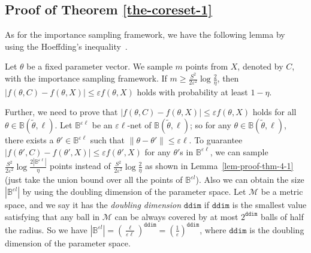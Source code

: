 \subsection{Proof of Theorem \ref{the-coreset-1}}\label{sec:proof-thm-4}
As for the importance sampling framework, we have the following lemma by using the Hoeffding's inequality~\cite{bachem2017practical}.
\begin{lemma}
\label{lem-proof-thm-4-1}
	Let $\theta$ be a fixed parameter vector. We sample $ m $ points from $ X $, denoted by $ C $, with the importance sampling framework. If $ m\geq \frac{S^2}{2\varepsilon^2}\log\frac{2}{\eta} $, then $ |{f}(\theta,C)-{f}(\theta,X)|\leq \varepsilon {f}(\theta,X) $ holds with probability at least $ 1-\eta $.
\end{lemma}
Further,   we need to prove that $ |{f}(\theta,C)-{f}(\theta,X)|\leq \varepsilon {f}(\theta,X) $ holds for all $ \theta\in\mathbb{B}(\tilde{\theta},\ell) $. Let $ \mathbb{B}^{\varepsilon \ell} $ be an $ \varepsilon \ell $-net of $ \mathbb{B}(\tilde{\theta},\ell) $; so for any $ \theta\in\mathbb{B}(\tilde{\theta},\ell) $, there exists a $ \theta'\in\mathbb{B}^{\varepsilon \ell} $ such that $ \|\theta-\theta' \|\leq \varepsilon \ell $. To guarantee  $ |{f}(\theta',C)-{f}(\theta',X)|\leq \varepsilon {f}(\theta',X) $  for any $ \theta' $s in $ \mathbb{B}^{\varepsilon \ell} $, we can sample $ \frac{S^2}{2\varepsilon^2}\log\frac{2|\mathbb{B}^{\varepsilon \ell}|}{\eta} $ points instead of $\frac{S^2}{2\varepsilon^2}\log\frac{2}{\eta}$ as shown in Lemma~\ref{lem-proof-thm-4-1} (just take the union bound over all the points of $\mathbb{B}^{\varepsilon l}$). 
Also we can obtain the size $ |\mathbb{B}^{\varepsilon l}| $ by using the doubling dimension of the parameter space. Let $ \mathcal{M} $ be a metric space, and we say it has the \emph{doubling dimension} $ \mathtt{ddim} $ if $ \mathtt{ddim} $ is the smallest value satisfying that any ball in $ \mathcal{M} $ can be always covered by at most $ 2^{\mathtt{ddim}} $ balls of half the radius.
So we have  
$ |\mathbb{B}^{\varepsilon l}|=\left( \frac{\ell}{\varepsilon\ell}\right)^{\mathtt{ddim}}=\left( \frac{1}{\varepsilon}\right)^{\mathtt{ddim}} $, where $ \mathtt{ddim} $ is the doubling dimension of the parameter space.

